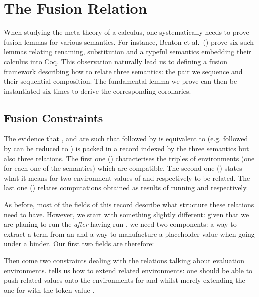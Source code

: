 \chapter{The Fusion Relation}
\label{sec:fusionrel}

When studying the meta-theory of a calculus, one systematically needs to prove
fusion lemmas for various semantics. For instance, Benton et al.~(\citeyear{benton2012strongly})
prove six such lemmas relating renaming, substitution and a typeful semantics
embedding their calculus into Coq. This observation naturally lead us to
defining a fusion framework describing how to relate three semantics: the pair
we sequence and their sequential composition. The fundamental lemma we prove
can then be instantiated six times to derive the corresponding corollaries.

\section{Fusion Constraints}

The evidence that ,  and  are such that  followed
by  is equivalent to  (e.g.  followed by 
can be reduced to ) is packed in a record  indexed by the
three semantics but also three relations. The first one () characterises the
triples of environments (one for each one of the semantics) which are compatible.
The second one () states what it means for two environment values of 
and  respectively to be related. The last one () relates computations
obtained as results of running  and  respectively.


As before, most of the fields of this record describe what structure these relations
need to have. However, we start with something slightly different: given that we are
planing to run the   \emph{after} having run , we need
two components: a way to extract a term from an  and a way to manufacture a
placeholder  value when going under a binder. Our first two fields are therefore:


Then come two constraints dealing with the relations talking about evaluation environments.
 tells us how to extend related environments: one should be able to push related
values onto the environments for  and  whilst merely extending the one
for  with the token value .

